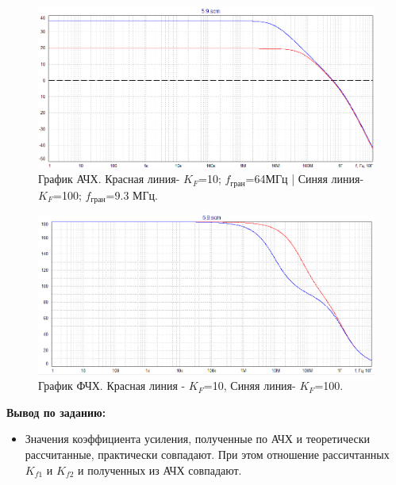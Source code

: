 \documentclass[a4paper,14pt]{extarticle}
\begin{document}
    \begin{figure}[h!]
        \captionsetup{justification=centering}
        \begin{center}
            \includegraphics[scale=0.6]{7.png}
        \end{center}
        \caption{График АЧХ. Красная линия- $K_F$=10; $f_\text{гран}$=64МГц | Синяя линия- $K_F$=100; $f_\text{гран}$=9.3 МГц.}
    \end{figure}

    \begin{figure}[h!]
        \begin{center}
            \includegraphics[scale=0.6]{8.png}
        \end{center}
        \caption{График ФЧХ. Красная линия - $K_F$=10, Синяя линия- $K_F$=100.}
    \end{figure}

    \textbf{Вывод по заданию:}

    \begin{itemize}
        \item Значения коэффициента усиления, полученные по АЧХ и теоретически рассчитанные, практически совпадают.
    При этом отношение рассичтанных $K_{f1}$ и $K_{f2}$ и полученных из АЧХ совпадают.
    \end{itemize}
\end{document}
